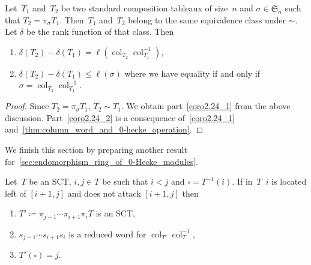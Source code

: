\documentclass[ALCO,ThmDefs,Unicode,epreuves]{cedram}
\newcommand{\fS}{\mathfrak{S}}
\newcommand{\fs}{s}
\newcommand{\col}{\operatorname{col}}
\newcommand{\cell}{\square}
\begin{document}
\begin{coro}
	\label{thm:rank_in_E_and_column_word}
	Let~$T_1$ and~$T_2$ be two standard composition tableaux of size~$n$ and $\sigma \in \fS_n$ such that $T_2 = \pi_\sigma T_1$. Then~$T_1$ and~$T_2$ belong to the same equivalence class under $\sim$. Let $\delta$ be the rank function of that class. Then
	\begin{enumerate}
		\item\label{coro2.24_1} $\delta(T_2) - \delta(T_1) = \ell(\col_{T_2}\col^{-1}_{T_1})$,
		\item\label{coro2.24_2} $\delta(T_2) - \delta(T_1) \leq \ell(\sigma)$ where we have equality if and only if $\sigma = \col_{T_2}\col_{T_1}^{-1}$.
	\end{enumerate}
\end{coro}


\begin{proof} Since $T_2 = \pi_\sigma T_1$, $T_2 \sim T_1$.
We obtain part~\eqref{coro2.24_1} from the above discussion. Part~\eqref{coro2.24_2} is a consequence of~\eqref{coro2.24_1} and~\cref{thm:column_word_and_0-hecke_operation}.
\end{proof}

We finish this section by preparing another result for~\cref{sec:endomorphism_ring_of_0-Hecke_modules}.

\begin{prop}
	\label{thm:mutliple_flips_same_cell}
	
	Let~$T$ be an SCT, $i,j\in T$ be such that $i<j$ and $\cell = T^{-1}(i)$. If in~$T$~$i$ is located left of $[i+1,j]$
	and does not attack $[i+1,j]$ then 
	\begin{enumerate}	
		\item\label{prop2.25_1} $T'\coloneqq \pi_{j-1} \cdots \pi_{i+1}\pi_i T$ is an SCT,
		\item\label{prop2.25_2} $\fs_{j-1} \cdots \fs_{i+1}\fs_i$ is a reduced word for $\col_{T'}\col_T^{-1}$,
		\item\label{prop2.25_3} $T'(\cell)= j$.
	\end{enumerate}
\end{prop}
\end{document}
